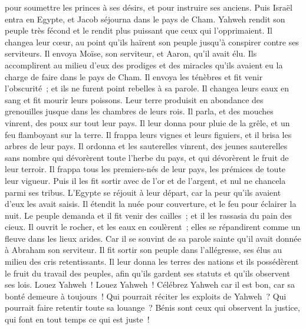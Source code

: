\begin{multicols}{2}
pour soumettre les princes à ses désirs, et pour instruire ses anciens.
Puis Israël entra en Egypte, et Jacob séjourna dans le pays de Cham.
Yahweh rendit son peuple très fécond et le rendit plus puissant que ceux qui l'opprimaient.
Il changea leur cœur, au point qu'ils haïrent son peuple jusqu'à conspirer contre ses serviteurs.
Il envoya Moïse, son serviteur, et Aaron, qu'il avait élu.
Ils accomplirent au milieu d'eux des prodiges et des miracles qu'ils avaient eu la charge de faire dans le pays de Cham.
Il envoya les ténèbres et fit venir l'obscurité~; et ils ne furent point rebelles à sa parole.
Il changea leurs eaux en sang et fit mourir leurs poissons.
Leur terre produisit en abondance des grenouilles jusque dans les chambres de leurs rois.
Il parla, et des mouches vinrent, des poux sur tout leur pays.
Il leur donna pour pluie de la grêle, et un feu flamboyant sur la terre.
Il frappa leurs vignes et leurs figuiers, et il brisa les arbres de leur pays.
Il ordonna et les sauterelles vinrent, des jeunes sauterelles sans nombre
qui dévorèrent toute l'herbe du pays, et qui dévorèrent le fruit de leur terroir.
Il frappa tous les premiers-nés de leur pays, les prémices de toute leur vigueur.
Puis il les fit sortir avec de l'or et de l'argent, et nul ne chancela parmi ses tribus.
L'Egypte se réjouit à leur départ, car la peur qu'ils avaient d'eux les avait saisis.
Il étendit la nuée pour couverture, et le feu pour éclairer la nuit.
Le peuple demanda et il fit venir des cailles~; et il les rassasia du pain des cieux.
Il ouvrit le rocher, et les eaux en coulèrent~; elles se répandirent comme un fleuve dans les lieux arides.
Car il se souvint de sa parole sainte qu'il avait donnée à Abraham son serviteur.
Il fit sortir son peuple dans l'allégresse, ses élus au milieu des cris retentissants.
Il leur donna les terres des nations et ils possédèrent le fruit du travail des peuples,
afin qu'ils gardent ses statuts et qu'ils observent ses lois. Louez Yahweh~!
\VerseOne{}Louez Yahweh~! Célébrez Yahweh car il est bon, car sa bonté demeure à toujours~!
Qui pourrait réciter les exploits de Yahweh~? Qui pourrait faire retentir toute sa louange~?
Bénis sont ceux qui observent la justice, qui font en tout temps ce qui est juste~!

\end{multicols}
